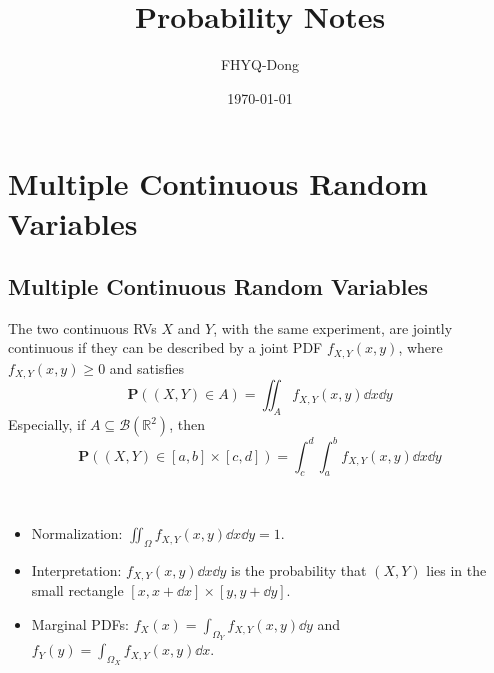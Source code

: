 \documentclass[device=normal, lang=en]{elegantbook}
\title{Probability Notes}
\author{FHYQ-Dong}
\date{\today}
\numberwithin{equation}{section}
\begin{document}
\maketitle
\frontmatter

\tableofcontents
\mainmatter










\chapter{Multiple Continuous Random Variables}


\section{Multiple Continuous Random Variables}

\begin{definition}
    The two continuous RVs $X$ and $Y$, with the same experiment, are jointly continuous if they can be described by a joint PDF $f_{X, Y}(x, y)$, where $f_{X, Y}(x, y) \geq 0$ and satisfies
    \begin{equation}
        \mathbf{P}((X, Y) \in A) = \iint_{A} f_{X, Y}(x, y) \dd{x} \dd{y}
    \end{equation}
    Especially, if $A \subseteq \mathcal{B}(\mathbb{R}^2)$, then
    \begin{equation}
        \mathbf{P}((X, Y) \in [a, b] \times [c, d]) = \int_{c}^{d} \int_{a}^{b} f_{X, Y}(x, y) \dd{x} \dd{y}
    \end{equation}
\end{definition}

\begin{property} ~
    \begin{itemize}
        \item Normalization: $\iint_{\Omega} f_{X, Y}(x, y) \dd{x} \dd{y} = 1$.
        \item Interpretation: $f_{X, Y}(x, y) \dd{x} \dd{y}$ is the probability that $(X, Y)$ lies in the small rectangle $[x, x + \dd{x}] \times [y, y + \dd{y}]$.
        \item Marginal PDFs: $f_{X}(x) = \int_{\Omega_{Y}} f_{X, Y}(x, y) \dd{y}$ and $f_{Y}(y) = \int_{\Omega_{X}} f_{X, Y}(x, y) \dd{x}$.
    \end{itemize}
\end{property}
\end{document}
